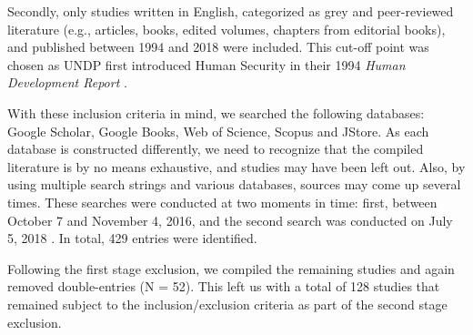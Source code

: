 \documentclass[10pt,a4paper]{article}
\begin{document}
\begin{multicols}{2}
Secondly, only studies written in English, categorized as grey and peer-reviewed literature (e.g., articles, books, edited volumes, chapters from editorial books), and published between 1994 and 2018 were included. This cut-off point was chosen as UNDP first introduced Human Security in their 1994 \textit{Human Development Report} \citep{R7}.

With these inclusion criteria in mind, we searched the following databases: Google Scholar, Google Books, Web of Science, Scopus and JStore. As each database is constructed differently, we need to recognize that the compiled literature is by no means exhaustive, and studies may have been left out. Also, by using multiple search strings and various databases, sources may come up several times. These searches were conducted at two moments in time: first, between October 7 and November 4, 2016, and the second search was conducted on July 5, 2018 \citep{R8}. In total, 429 entries were identified.


Following the first stage exclusion, we compiled the remaining studies and again removed double-entries (N = 52). This left us with a total of 128 studies that remained subject to the inclusion/exclusion criteria as part of the second stage exclusion. 


\end{multicols}
\end{document}
